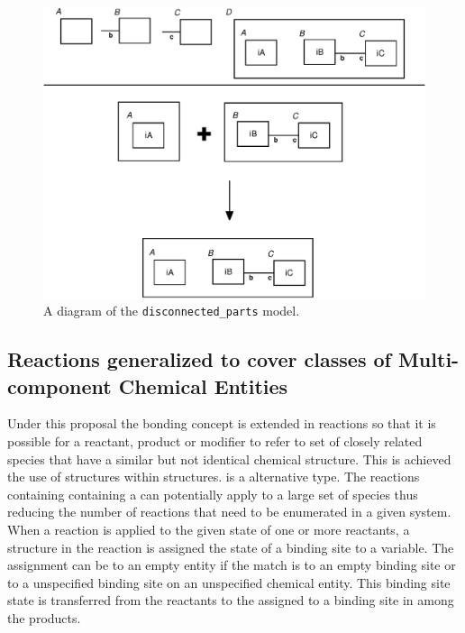 \documentclass{cekarticle}
\begin{document}
\begin{figure}[h]
  \vspace*{8pt}
  \centering
  \includegraphics[scale = 0.7]{disconnected_parts.eps}
  \caption{A diagram of the \texttt{disconnected\_parts} model.}
  \label{fig:disconnected_parts}
\end{figure}

\subsection{Reactions generalized to cover classes of Multi-component Chemical Entities}
\label{sec:generalizedreactions}

Under this proposal the bonding concept is extended in reactions so that it is possible 
for a reactant, product or modifier to refer to set of closely related species that have a 
similar but not identical chemical structure.  
This is achieved the use of  structures within 
structures.
 is a alternative  type.  The reactions containing containing a
 can potentially
apply to a large set of species thus reducing the number of reactions that need to be enumerated in
a given system.
When a reaction is applied to the given state of one or more reactants, a  structure
in the reaction is assigned the state of a binding site to a variable.  The assignment can be to
an empty entity if the match is to an empty binding site or to a unspecified binding site on
an unspecified chemical entity.  This binding site state is transferred from the reactants to the
assigned to a binding site in among the products.
\end{document}

